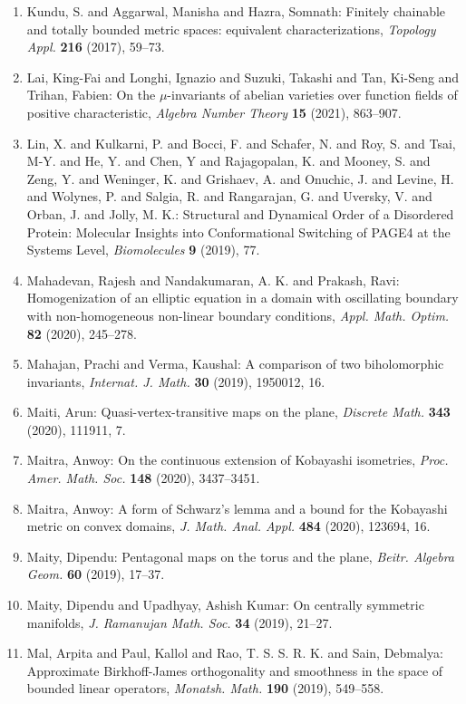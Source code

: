 \begin{enumerate}
\item Kundu, S. and Aggarwal, Manisha and Hazra, Somnath: Finitely chainable and totally bounded metric spaces:
equivalent characterizations, \emph{Topology Appl.} {\bf 216} (2017), 59--73.
\item Lai, King-Fai and Longhi, Ignazio and Suzuki, Takashi and Tan,
Ki-Seng and Trihan, Fabien: On the {$\mu$}-invariants of abelian varieties over function
fields of positive characteristic, \emph{Algebra Number Theory} {\bf 15} (2021), 863--907.
\item Lin, X. and Kulkarni, P. and Bocci, F. and Schafer, N. and Roy, S. and Tsai, M-Y. and He, Y. and Chen, Y and Rajagopalan, K. and Mooney, S. and Zeng, Y. and Weninger, K. and Grishaev, A. and Onuchic, J. and Levine, H. and Wolynes, P. and Salgia, R. and Rangarajan, G. and Uversky, V. and Orban, J. and Jolly, M. K.: Structural and Dynamical Order of a Disordered Protein: Molecular Insights into Conformational Switching of PAGE4 at the Systems Level, \emph{Biomolecules} {\bf 9} (2019), 77.
\item Mahadevan, Rajesh and Nandakumaran, A. K. and Prakash, Ravi: Homogenization of an elliptic equation in a domain with
oscillating boundary with non-homogeneous non-linear boundary
conditions, \emph{Appl. Math. Optim.} {\bf 82} (2020), 245--278.
\item Mahajan, Prachi and Verma, Kaushal: A comparison of two biholomorphic invariants, \emph{Internat. J. Math.} {\bf 30} (2019), 1950012, 16.
\item Maiti, Arun: Quasi-vertex-transitive maps on the plane, \emph{Discrete Math.} {\bf 343} (2020), 111911, 7.
\item Maitra, Anwoy: On the continuous extension of {K}obayashi isometries, \emph{Proc. Amer. Math. Soc.} {\bf 148} (2020), 3437--3451.
\item Maitra, Anwoy: A form of {S}chwarz's lemma and a bound for the {K}obayashi
metric on convex domains, \emph{J. Math. Anal. Appl.} {\bf 484} (2020), 123694, 16.
\item Maity, Dipendu: Pentagonal maps on the torus and the plane, \emph{Beitr. Algebra Geom.} {\bf 60} (2019), 17--37.
\item Maity, Dipendu and Upadhyay, Ashish Kumar: On centrally symmetric manifolds, \emph{J. Ramanujan Math. Soc.} {\bf 34} (2019), 21--27.
\item Mal, Arpita and Paul, Kallol and Rao, T. S. S. R. K. and Sain,
Debmalya: Approximate {B}irkhoff-{J}ames orthogonality and smoothness in
the space of bounded linear operators, \emph{Monatsh. Math.} {\bf 190} (2019), 549--558.

\end{enumerate}
